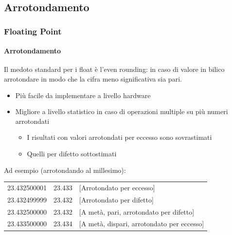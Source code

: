 \documentclass{beamer}
\begin{document}
  \subsection{Arrotondamento}
  \begin{frame}
	    \frametitle{Floating Point}
	    \framesubtitle{Arrotondamento}
	    Il medoto standard per i float è l'even rounding: in caso di valore in bilico arrotondare
	    in modo che la cifra meno significativa sia pari.
	    \begin{itemize}
	    		\item Più facile da implementare a livello hardware
	    		\item Migliore a livello statistico in caso di operazioni multiple su più numeri arrotondati
	    		\begin{itemize}
	    			\item I risultati con valori arrotondati per eccesso sono sovrastimati
	    			\item Quelli per difetto sottostimati
	    		\end{itemize}
	    \end{itemize}
	    
	    \pause
	    \vspace{2em}
	    
	    Ad esempio (arrotondando al millesimo):
	    \begin{center}
	    		\begin{tabular}{ccl}
	    		23.432500001 & 23.433 & [Arrotondato per eccesso] \\ 
	    		23.432499999 & 23.432 & [Arrotondato per difetto] \\ 
	    		23.432500000 & 23.432 & [A metà, pari, arrotondato per difetto] \\ 
	    		23.433500000 & 23.434 & [A metà, dispari, arrotondato per eccesso] \\ 
	    		\end{tabular} 
	    \end{center}
	  \end{frame}
\end{document}
